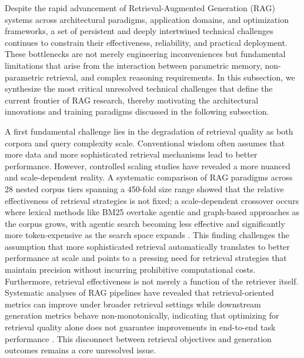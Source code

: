 \documentclass[11pt]{article}
\begin{document}
Despite the rapid advancement of Retrieval-Augmented Generation (RAG) systems across architectural paradigms, application domains, and optimization frameworks, a set of persistent and deeply intertwined technical challenges continues to constrain their effectiveness, reliability, and practical deployment. These bottlenecks are not merely engineering inconveniences but fundamental limitations that arise from the interaction between parametric memory, non-parametric retrieval, and complex reasoning requirements. In this subsection, we synthesize the most critical unresolved technical challenges that define the current frontier of RAG research, thereby motivating the architectural innovations and training paradigms discussed in the following subsection.

A first fundamental challenge lies in the degradation of retrieval quality as both corpora and query complexity scale. Conventional wisdom often assumes that more data and more sophisticated retrieval mechanisms lead to better performance. However, controlled scaling studies have revealed a more nuanced and scale-dependent reality. A systematic comparison of RAG paradigms across 28 nested corpus tiers spanning a 450-fold size range showed that the relative effectiveness of retrieval strategies is not fixed; a scale-dependent crossover occurs where lexical methods like BM25 overtake agentic and graph-based approaches as the corpus grows, with agentic search becoming less effective and significantly more token-expensive as the search space expands \cite{ref100}. This finding challenges the assumption that more sophisticated retrieval automatically translates to better performance at scale and points to a pressing need for retrieval strategies that maintain precision without incurring prohibitive computational costs. Furthermore, retrieval effectiveness is not merely a function of the retriever itself. Systematic analyses of RAG pipelines have revealed that retrieval-oriented metrics can improve under broader retrieval settings while downstream generation metrics behave non-monotonically, indicating that optimizing for retrieval quality alone does not guarantee improvements in end-to-end task performance \cite{ref597}. This disconnect between retrieval objectives and generation outcomes remains a core unresolved issue.
\end{document}
